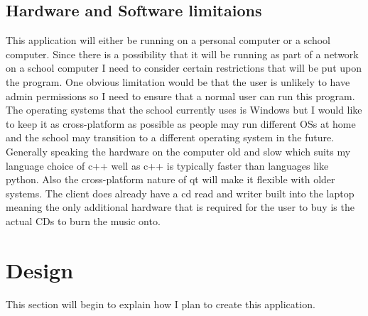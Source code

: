 \documentclass{article}
\begin{document}
\subsection{Hardware and Software limitaions}\label{SoftwareAndHardware}
This application will either be running on a personal computer or a school computer.
Since there is a possibility that it will be running as part of a network on a school
computer I need to consider certain restrictions that will be put upon the program.
One obvious limitation would be that the user is unlikely to have admin permissions
so I need to ensure that a normal user can run this program. The operating systems
that the school currently uses is Windows but I would like to keep it as cross-platform
as possible as people may run different OSs at home and the school may transition to
a different operating system in the future.
Generally speaking the hardware on the computer old and slow which suits my language choice
of c++ well as c++ is typically faster than languages like python. Also the cross-platform
nature of qt will make it flexible with older systems.
The client does already have a cd read and writer built into the laptop meaning the only
additional hardware that is required for the user to buy is the actual CDs to burn the
music onto.
\section{Design}\label{design}
This section will begin to explain how I plan to create this application.
\end{document}
